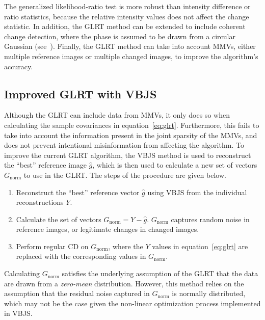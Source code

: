 \documentclass{article}
\begin{document}
The generalized likelihood-ratio test is more robust than intensity difference or ratio statistics, because the relative intensity values does not affect the change statistic. In addition, the GLRT method can be extended to include coherent change detection, where the phase is assumed to be drawn from a circular Gaussian (see~\cite{Ash_2014}). Finally, the GLRT method can take into account MMVs, either multiple reference images or multiple changed images, to improve the algorithm's accuracy.

\subsection{Improved GLRT with VBJS}

Although the GLRT can include data from MMVs, it only does so when calculating the sample covariances in equation~\ref{eq:glrt}. Furthermore, this fails to take into account the information present in the joint sparsity of the MMVs, and does not prevent intentional misinformation from affecting the algorithm. To improve the current GLRT algorithm, the VBJS method is used to reconstruct the ``best'' reference image $\hat{g}$, which is then used to calculate a new set of vectors $G_\text{norm}$ to use in the GLRT. The steps of the procedure are given below.

\begin{enumerate}
    \item Reconstruct the ``best'' reference vector $\hat{g}$ using VBJS from the individual reconstructions $Y$.
    \item Calculate the set of vectors $G_\text{norm} = Y - \hat{g}$. $G_\text{norm}$ captures random noise in reference images, or legitimate changes in changed images.
    \item Perform regular CD on $G_\text{norm}$, where the $Y$ values in equation~\ref{eq:glrt} are replaced with the corresponding values in $G_\text{norm}$.
\end{enumerate}


Calculating $G_\text{norm}$ satisfies the underlying assumption of the GLRT that the data are drawn from a \emph{zero-mean} distribution. However, this method relies on the assumption that the residual noise captured in $G_\text{norm}$ is normally distributed, which may not be the case given the non-linear optimization process implemented in VBJS.






\end{document}
